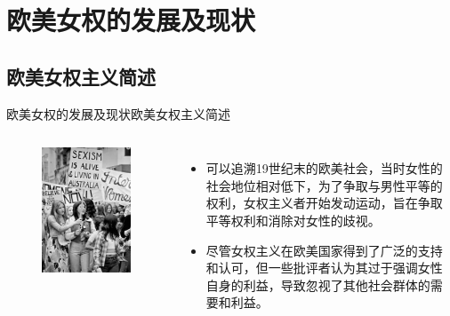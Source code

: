 \documentclass{beamer}
\begin{document}
	\section{欧美女权的发展及现状}
	\subsection*{欧美女权主义简述}
	\begin{frame}{欧美女权的发展及现状}{欧美女权主义简述
		}
		\begin{columns}
			\begin{figure}
				\centering
				\includegraphics[width=\textwidth]{img/Snipaste_2023-05-30_22-49-57.png}
			\end{figure}

			\begin{itemize}
				\item 可以追溯19世纪末的欧美社会，当时女性的社会地位相对低下，为了争取与男性平等的权利，女权主义者开始发动运动，旨在争取平等权利和消除对女性的歧视。
				\item 尽管女权主义在欧美国家得到了广泛的支持和认可，但一些批评者认为其过于强调女性自身的利益，导致忽视了其他社会群体的需要和利益。
			\end{itemize}

		\end{columns}
	\end{frame}
\end{document}
